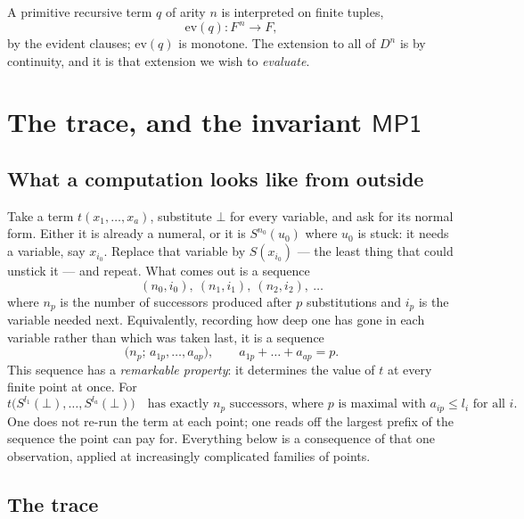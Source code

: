\documentclass[11pt]{article}
\newcommand{\ev}{\mathrm{ev}}
\newcommand{\D}{D}
\newcommand{\Fin}{F}
\newcommand{\MP}{\mathsf{MP1}}
\theoremstyle{definition}
\begin{document}
A primitive recursive term $q$ of arity $n$ is interpreted on finite
tuples,
\[
\ev(q) : \Fin^{\,n} \longrightarrow \Fin,
\]
by the evident clauses; $\ev(q)$ is monotone. The extension to all of
$\D^n$ is by continuity, and it is that extension we wish to
\emph{evaluate}.

\section{The trace, and the invariant $\MP$}
\label{sec:trace}

\subsection{What a computation looks like from outside}

Take a term $t(x_1,\dots,x_a)$, substitute $\bot$ for every variable, and
ask for its normal form. Either it is already a numeral, or it is
$S^{n_0}(u_0)$ where $u_0$ is stuck: it needs a variable, say $x_{i_0}$.
Replace that variable by $S(x_{i_0})$ --- the least thing that could
unstick it --- and repeat. What comes out is a sequence
\[
(n_0,i_0),\ (n_1,i_1),\ (n_2,i_2),\ \dots
\]
where $n_p$ is the number of successors produced after $p$ substitutions
and $i_p$ is the variable needed next. Equivalently, recording how deep
one has gone in each variable rather than which was taken last, it is a
sequence
\[
\bigl(n_p;\, a_{1p},\dots,a_{ap}\bigr), \qquad a_{1p}+\dots+a_{ap} = p .
\]
This sequence has a \emph{remarkable property}: it determines the value of
$t$ at every finite point at once. For
\[
t\bigl(S^{l_1}(\bot),\dots,S^{l_a}(\bot)\bigr)
\quad\text{has exactly } n_p \text{ successors, where $p$ is
maximal with } a_{ip} \le l_i \text{ for all } i .
\]
One does not re-run the term at each point; one reads off the largest
prefix of the sequence the point can pay for. Everything below is a
consequence of that one observation, applied at increasingly complicated
families of points.

\subsection{The trace}
\end{document}
